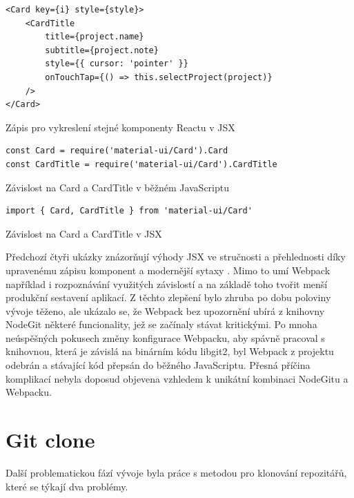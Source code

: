 \begin{listing}[ht]
\begin{verbatim}
<Card key={i} style={style}>
	<CardTitle
		title={project.name}
		subtitle={project.note}
		style={{ cursor: 'pointer' }}
		onTouchTap={() => this.selectProject(project)}
	/>
</Card>
\end{verbatim}
\caption[Komponenta v JSX]{Zápis pro vykreslení stejné komponenty Reactu v JSX}
\end{listing}

\begin{listing}[ht]
	\begin{verbatim}
const Card = require('material-ui/Card').Card
const CardTitle = require('material-ui/Card').CardTitle
	\end{verbatim}
	\caption[Závislosti v JavaScriptu]{Závislost na Card a CardTitle v běžném JavaScriptu}
\end{listing}

\begin{listing}[ht]
	\begin{verbatim}
import { Card, CardTitle } from 'material-ui/Card'
	\end{verbatim}
	\caption[Závislost v JSX]{Závislost na Card a CardTitle v JSX}
\end{listing}

\FloatBarrier

Předchozí čtyři ukázky znázorňují výhody JSX ve stručnosti a přehlednosti díky upravenému zápisu komponent a modernější sytaxy . Mimo to umí Webpack například i rozpoznávání využitých závislostí a na základě toho tvořit menší produkční sestavení aplikací. Z těchto zlepšení bylo zhruba po dobu poloviny vývoje těženo, ale ukázalo se, že Webpack bez upozornění ubírá z knihovny NodeGit některé funcionality, jež se začínaly stávat kritickými. Po mnoha neúspěšných pokusech změny konfigurace Webpacku, aby spávně pracoval s knihovnou, která je závislá na binárním kódu libgit2, byl Webpack z projektu odebrán a stávající kód přepsán do běžného JavaScriptu. Přesná příčina komplikací nebyla doposud objevena vzhledem k unikátní kombinaci NodeGitu a Webpacku.

\section{Git clone}

Další problematickou fází vývoje byla práce s metodou pro klonování repozitářů, které se týkají dva problémy.

